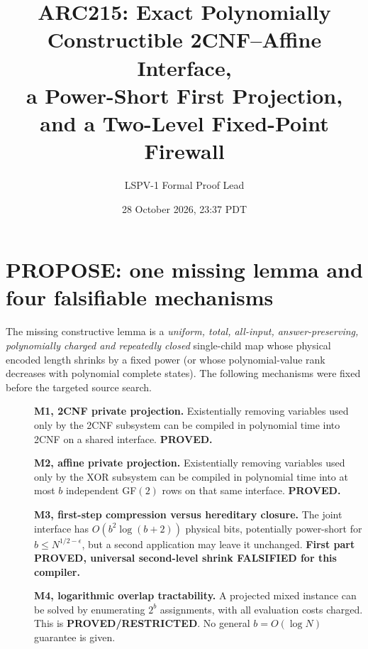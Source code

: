 \documentclass[11pt]{article}
\title{ARC215: Exact Polynomially Constructible 2CNF--Affine Interface,\\a Power-Short First Projection, and a Two-Level Fixed-Point Firewall}
\author{LSPV-1 Formal Proof Lead}
\date{28 October 2026, 23:37 PDT}
\begin{document}
\maketitle
\begin{center}\end{center}

\section{PROPOSE: one missing lemma and four falsifiable mechanisms}
The missing constructive lemma is a \emph{uniform, total, all-input, answer-preserving, polynomially charged and repeatedly closed} single-child map whose physical encoded length shrinks by a fixed power (or whose polynomial-value rank decreases with polynomial complete states). The following mechanisms were fixed before the targeted source search.
\begin{description}
\item[]\textbf{M1, 2CNF private projection.} Existentially removing variables used only by the 2CNF subsystem can be compiled in polynomial time into 2CNF on a shared interface. \textbf{PROVED.}
\item[]\textbf{M2, affine private projection.} Existentially removing variables used only by the XOR subsystem can be compiled in polynomial time into at most $b$ independent GF$(2)$ rows on that same interface. \textbf{PROVED.}
\item[]\textbf{M3, first-step compression versus hereditary closure.} The joint interface has $O(b^2\log(b+2))$ physical bits, potentially power-short for $b\le N^{1/2-\epsilon}$, but a second application may leave it unchanged. \textbf{First part PROVED, universal second-level shrink FALSIFIED for this compiler.}
\item[]\textbf{M4, logarithmic overlap tractability.} A projected mixed instance can be solved by enumerating $2^b$ assignments, with all evaluation costs charged. This is \textbf{PROVED/RESTRICTED}. No general $b=O(\log N)$ guarantee is given.
\end{description}
\end{document}
